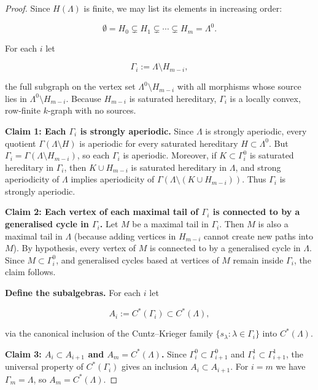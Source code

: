 \documentclass[12pt]{amsart}
\theoremstyle{plain}
\theoremstyle{definition}
\theoremstyle{remark}
\begin{document}
\begin{proof}
Since $H(\Lambda)$ is finite, we may list its elements in increasing
order:


\[
\emptyset = H_0 \subsetneq H_1 \subsetneq \cdots \subsetneq H_m = \Lambda^0.
\]


For each $i$ let


\[
\Gamma_i := \Lambda\setminus H_{m-i},
\]


the full subgraph on the vertex set $\Lambda^0\setminus H_{m-i}$ with
all morphisms whose source lies in $\Lambda^0\setminus H_{m-i}$.
Because $H_{m-i}$ is saturated hereditary, $\Gamma_i$ is a locally
convex, row-finite $k$-graph with no sources.

\smallskip

\textbf{Claim 1: Each $\Gamma_i$ is strongly aperiodic.}
Since $\Lambda$ is strongly aperiodic, every quotient
$\Gamma(\Lambda\setminus H)$ is aperiodic for every saturated hereditary
$H\subset\Lambda^0$. But $\Gamma_i = \Gamma(\Lambda\setminus H_{m-i})$,
so each $\Gamma_i$ is aperiodic. Moreover, if $K\subset\Gamma_i^0$
is saturated hereditary in $\Gamma_i$, then $K\cup H_{m-i}$ is
saturated hereditary in $\Lambda$, and strong aperiodicity of
$\Lambda$ implies aperiodicity of $\Gamma(\Lambda\setminus (K\cup H_{m-i}))$.
Thus $\Gamma_i$ is strongly aperiodic.

\smallskip

\textbf{Claim 2: Each vertex of each maximal tail of $\Gamma_i$ is
connected to by a generalised cycle in $\Gamma_i$.}
Let $M$ be a maximal tail in $\Gamma_i$. Then $M$ is also a maximal
tail in $\Lambda$ (because adding vertices in $H_{m-i}$ cannot create
new paths into $M$). By hypothesis, every vertex of $M$ is connected
to by a generalised cycle in $\Lambda$. Since $M\subset\Gamma_i^0$,
and generalised cycles based at vertices of $M$ remain inside
$\Gamma_i$, the claim follows.

\smallskip

\textbf{Define the subalgebras.}
For each $i$ let


\[
A_i := C^*(\Gamma_i) \subset C^*(\Lambda),
\]


via the canonical inclusion of the Cuntz--Krieger family
$\{s_\lambda : \lambda\in\Gamma_i\}$ into $C^*(\Lambda)$.

\smallskip

\textbf{Claim 3: $A_i \subset A_{i+1}$ and $A_m = C^*(\Lambda)$.}
Since $\Gamma_i^0 \subset \Gamma_{i+1}^0$ and
$\Gamma_i^1 \subset \Gamma_{i+1}^1$, the universal property of
$C^*(\Gamma_i)$ gives an inclusion $A_i\subset A_{i+1}$.  
For $i=m$ we have $\Gamma_m = \Lambda$, so $A_m=C^*(\Lambda)$.


\end{proof}
\end{document}
